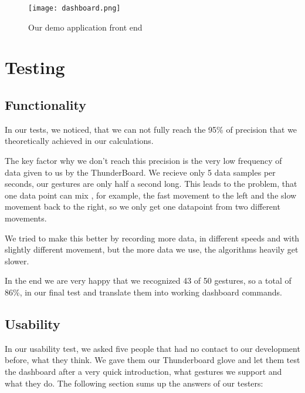 \begin{figure}[htp]
\begin{center}
  \texttt{[image: dashboard.png]}
\caption{Our demo application front end}
\end{center}
\end{figure} 


\chapter{Testing}
\label{ch:Tests}

\section{Functionality}
\label{ch:Results:sec:Functionality}

In our tests, we noticed, that we can not fully reach the 95\% of precision that we theoretically achieved in our calculations.

The key factor why we don't reach this precision is the very low frequency of data given to us by the ThunderBoard.
We recieve only 5 data samples per seconds, our gestures are only half a second long.
This leads to the problem, that one data point can mix , for example, the fast movement to the left and the slow movement back to the right, so we only get one datapoint from two different movements.

We tried to make this better by recording more data, in different speeds and with slightly different movement, but the more data we use, the algorithms heavily get slower.

In the end we are very happy that we recognized 43 of 50 gestures, so a total of 86\%, in our final test and translate them into working dashboard commands.

\section{Usability}
\label{ch:Results:sec:Usability}

In our usability test, we asked five people that had no contact to our development before, what they think.
We gave them our Thunderboard glove and let them test the dashboard after a very quick introduction, what gestures we support and what they do.
The following section sums up the answers of our testers:


